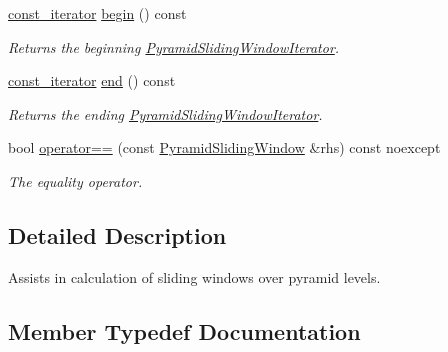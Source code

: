 \begin{DoxyCompactItemize}
\hyperlink{classdg_1_1deepcore_1_1imagery_1_1_pyramid_sliding_window_ac39f725e03255cd3776e47672a02e78f}{const\+\_\+iterator} \hyperlink{group___imagery_module_gac0245ad134745b2621ecc95ca7aa5219}{begin} () const 
\begin{DoxyCompactList}\small\item\em Returns the beginning \hyperlink{classdg_1_1deepcore_1_1imagery_1_1_pyramid_sliding_window_iterator}{Pyramid\+Sliding\+Window\+Iterator}. \end{DoxyCompactList}\item 
\hyperlink{classdg_1_1deepcore_1_1imagery_1_1_pyramid_sliding_window_ac39f725e03255cd3776e47672a02e78f}{const\+\_\+iterator} \hyperlink{group___imagery_module_gaf39101c886a6ca5194201848f7d6d831}{end} () const 
\begin{DoxyCompactList}\small\item\em Returns the ending \hyperlink{classdg_1_1deepcore_1_1imagery_1_1_pyramid_sliding_window_iterator}{Pyramid\+Sliding\+Window\+Iterator}. \end{DoxyCompactList}\item 
bool \hyperlink{group___imagery_module_ga1b88dd8ec7d6e4c9841dfa93b64c763e}{operator==} (const \hyperlink{classdg_1_1deepcore_1_1imagery_1_1_pyramid_sliding_window}{Pyramid\+Sliding\+Window} \&rhs) const noexcept
\begin{DoxyCompactList}\small\item\em The equality operator. \end{DoxyCompactList}\end{DoxyCompactItemize}


\subsection{Detailed Description}
Assists in calculation of sliding windows over pyramid levels. 

\subsection{Member Typedef Documentation}
